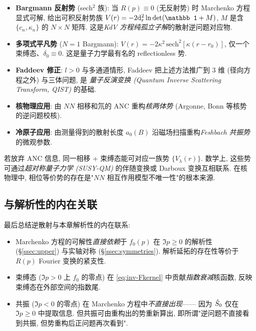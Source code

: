 \begin{itemize}
  \item \textbf{Bargmann 反射势} (sech$^2$ 族): 当 $R(p)\equiv 0$ (无反射势) 时 Marchenko 方程显式可解, 给出可积反射势族 $V(r)=-2\rmd_r^2\ln\det(\mathbb 1+M)$, $M$ 是含 $\{c_n,\kappa_n\}$ 的 $N\times N$ 矩阵. 这是\emph{KdV 方程纯孤立子解}的散射逆问题对应物.
  \item \textbf{多项式平凡势} ($N=1$ Bargmann): $V(r)=-2\kappa^2\,\mathrm{sech}^2[\kappa(r-r_0)]$, 仅一个束缚态、$\delta_0\equiv 0$. 这是量子力学最有名的 reflectionless 势.
  \item \textbf{Faddeev 修正}: $l>0$ 与多通道情形, Faddeev 把上述方法推广到 $3$ 维 (径向方程之外) 与三体问题, 是 \emph{量子反演变换 (Quantum Inverse Scattering Transform, QIST)} 的基础.
  \item \textbf{核物理应用}: 由 $NN$ 相移和氘的 ANC 重构\emph{核两体势} (Argonne, Bonn 等核势的逆问题校核).
  \item \textbf{冷原子应用}: 由测量得到的散射长度 $a_0(B)$ 沿磁场扫描重构\emph{Feshbach 共振势}的微观参数.
\end{itemize}

\begin{remark}[相位等价势]
  若放弃 ANC 信息, 同一相移 + 束缚态能可对应一族势 $\{V_\lambda(r)\}$. 数学上, 这些势可通过\emph{超对称量子力学 (SUSY-QM)} 的伴随变换或 Darboux 变换互相联系. 在核物理中, 相位等价势的存在是"$NN$ 相互作用模型不唯一性"的根本来源.
\end{remark}

\subsection{与解析性的内在关联}\label{ssec:anlyt-inverse-analytic}

最后总结逆散射与本章解析性的内在联系:
\begin{itemize}
  \item Marchenko 方程的可解性\emph{直接依赖}于 $f_0(p)$ 在 $\Im p\ge 0$ 的解析性 (\S\ref{ssec:upper}) 与实轴对称 (\S\ref{ssec:symmetries}). 解析延拓的存在性等价于 $R(p)$ Fourier 变换的紧支性.
  \item 束缚态 ($\Im p>0$ 上 $f_0$ 的零点) 在 \eqref{eq:inv-Fkernel} 中贡献\emph{指数衰减}核函数, 反映束缚态在外部空间的指数尾.
  \item 共振 ($\Im p<0$ 的零点) 在 Marchenko 方程中\emph{不直接出现}—— 因为 $\hat{S}_0$ 仅在 $\Im p\ge 0$ 中提取信息. 但共振可由重构出的势重新算出, 即所谓"逆问题不直接看到共振, 但势重构后正问题再次看到".
\end{itemize}


